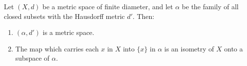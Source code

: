 Let $(X, d)$ be a metric space of finite diameter, and let $\alpha$ be the family of all closed subsets with the Hausdorff metric $d'$. Then:
\begin{enumerate}
\item $(\alpha, d')$ is a metric space.
\item The map which carries each $x$ in $X$ into $\{x\}$ in $\alpha$ is an isometry of $X$ onto a subspace of $\alpha$.
\end{enumerate}

